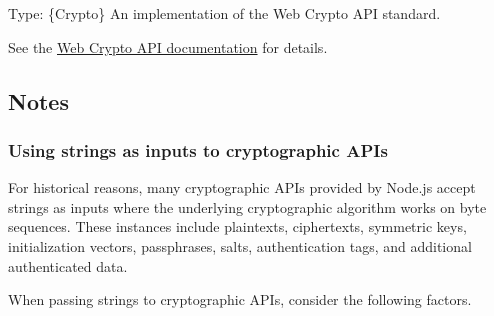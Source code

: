 Type: \{Crypto\} An implementation of the Web Crypto API standard.

See the \href{webcrypto.md}{Web Crypto API documentation} for details.

\subsection{Notes}\label{notes}

\subsubsection{Using strings as inputs to cryptographic
APIs}\label{using-strings-as-inputs-to-cryptographic-apis}

For historical reasons, many cryptographic APIs provided by Node.js
accept strings as inputs where the underlying cryptographic algorithm
works on byte sequences. These instances include plaintexts,
ciphertexts, symmetric keys, initialization vectors, passphrases, salts,
authentication tags, and additional authenticated data.

When passing strings to cryptographic APIs, consider the following
factors.

